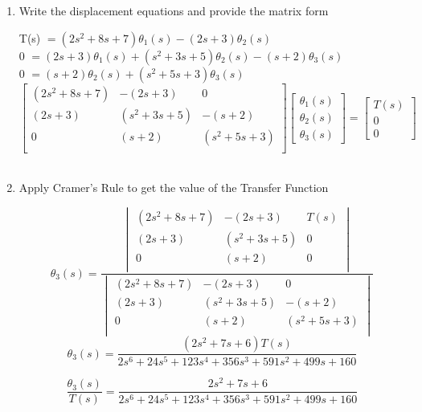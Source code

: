 ﻿\documentclass[11pt]{article}
\begin{document}
\begin{enumerate}[label=(\alph*),itemindent=*, itemindent=*, leftmargin=*, nolistsep]
\begin{center}
    \end{center}
\vspace{15pt}
    \item Write the displacement equations and provide the matrix form
\begin{center}
    T(s) $= (2s^2 + 8s + 7)\theta_1(s) - (2s + 3)\theta_2(s)$\\
    0 $= (2s + 3)\theta_1(s) + (s^2 + 3s + 5)\theta_2(s) - (s + 2)\theta_3(s)$\\
    0 $= (s + 2)\theta_2(s) + (s^2 + 5s + 3)\theta_3(s)$\\
    \[
        \begin{bmatrix}
        (2s^2 + 8s + 7) & -(2s + 3) & 0\\
        (2s + 3) & (s^2 + 3s + 5) & -(s + 2)\\
        0 & (s + 2) & (s^2 + 5s + 3)\\
        \end{bmatrix}
        \begin{bmatrix}
        \theta_1(s) \\
        \theta_2(s) \\
        \theta_3(s)
        \end{bmatrix}
        =
        \begin{bmatrix}
        T(s)\\
        0\\
        0
        \end{bmatrix}
    \]\\
\end{center}
\vspace{15pt}
    \item Apply Cramer's Rule to get the value of the Transfer Function
\begin{center}
    \[
        \theta_3(s) = 
            \frac{\begin{vmatrix}
                (2s^2 + 8s + 7) & -(2s + 3) & T(s)\\
                (2s + 3) & (s^2 + 3s + 5) & 0\\
                0 & (s + 2) & 0\\
            \end{vmatrix}
        }{\begin{vmatrix}
                (2s^2 + 8s + 7) & -(2s + 3) & 0\\
                (2s + 3) & (s^2 + 3s + 5) & -(s + 2)\\
                0 & (s + 2) & (s^2 + 5s + 3)\\
            \end{vmatrix}
        }
    \]
    \[
    \theta_3(s) = \frac{(2s^2 + 7s + 6)T(s)}{2s^6 + 24s^5 + 123s^4 + 356s^3 + 591s^2 + 499s + 160}
    \] 

    \[
    \boxed{\frac{\theta_3(s)}{T(s)} = \frac{2s^2 + 7s + 6}{2s^6 + 24s^5 + 123s^4 + 356s^3 + 591s^2 + 499s + 160}}
    \] 

\end{center}
\end{enumerate}
\end{document}
